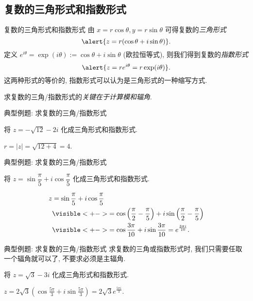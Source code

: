 \subsection{复数的三角形式和指数形式}
\begin{frame}{复数的三角形式和指数形式}
\onslide<+->
由 $x=r\cos\theta,y=r\sin\theta$ 可得复数的\emph{三角形式}
\[\alert{z=r(\cos\theta+i\sin\theta)}.\]
\onslide<+->
定义 $e^{i\theta}=\exp(i\theta):=\cos\theta+i\sin\theta$ (欧拉恒等式),
\onslide<+->
则我们得到复数的\emph{指数形式}
\[\alert{z=re^{i\theta}=r\exp(i\theta)}.\]
\onslide<+->
这两种形式的等价的, 指数形式可以认为是三角形式的一种缩写方式.

\onslide<+->
求复数的三角/指数形式的\emph{关键在于计算模和辐角}.
\end{frame}


\begin{frame}{典型例题: 求复数的三角/指数形式}
\onslide<+->
\begin{example}
将 $z=-\sqrt{12}-2i$ 化成三角形式和指数形式.
\end{example}
\onslide<+->
\begin{solution}
$r=|z|=\sqrt{12+4}=4$.
\end{solution}
\end{frame}


\begin{frame}{典型例题: 求复数的三角/指数形式}
\onslide<+->
\begin{example}
将 $z=\sin\dfrac\pi5+i\cos\dfrac\pi5$ 化成三角形式和指数形式.
\end{example}
\onslide<+->
\begin{solution}
\vspace{-\baselineskip}
\begin{align*}
z&=\sin\frac\pi5+i\cos\frac\pi5\\
&\visible<+->{=\cos\left(\frac\pi2-\frac\pi5\right)+i\sin\left(\frac\pi2-\frac\pi5\right)}\\
&\visible<+->{=\cos\frac{3\pi}{10}+i\sin\frac{3\pi}{10}=e^{\frac{3\pi i}{10}}.}
\end{align*}
\end{solution}
\end{frame}


\begin{frame}{典型例题: 求复数的三角/指数形式}
\onslide<+->
求复数的三角或指数形式时, 我们只需要任取一个辐角就可以了, 不要求必须是主辐角.
\onslide<+->
\begin{exercise}
将 $z=\sqrt 3-3i$ 化成三角形式和指数形式.
\end{exercise}
\onslide<+->
\begin{answer}
$\displaystyle z=2\sqrt3\left(\cos\frac{5\pi}3+i\sin\frac{5\pi}3\right)
=2\sqrt3e^{\frac{5\pi i}3}$.
\end{answer}
\end{frame}


